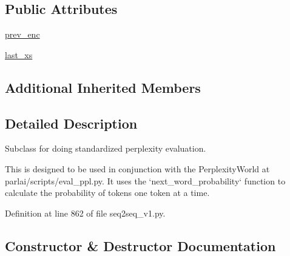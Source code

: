 \subsection*{Public Attributes}
\begin{DoxyCompactItemize}
\item 
\hyperlink{classparlai_1_1agents_1_1legacy__agents_1_1seq2seq_1_1seq2seq__v1_1_1PerplexityEvaluatorAgent_a8f896a71b1f4eef69d66f3ae48156937}{prev\+\_\+enc}
\item 
\hyperlink{classparlai_1_1agents_1_1legacy__agents_1_1seq2seq_1_1seq2seq__v1_1_1PerplexityEvaluatorAgent_a637c8434588948fb0367cd749c18e690}{last\+\_\+xs}
\end{DoxyCompactItemize}
\subsection*{Additional Inherited Members}


\subsection{Detailed Description}
\begin{DoxyVerb}Subclass for doing standardized perplexity evaluation.

This is designed to be used in conjunction with the PerplexityWorld at
parlai/scripts/eval_ppl.py. It uses the `next_word_probability` function to
calculate the probability of tokens one token at a time.
\end{DoxyVerb}
 

Definition at line 862 of file seq2seq\+\_\+v1.\+py.



\subsection{Constructor \& Destructor Documentation}
\mbox{\label{classparlai_1_1agents_1_1legacy__agents_1_1seq2seq_1_1seq2seq__v1_1_1PerplexityEvaluatorAgent_acf3daa1b1bfc893504efa07f3eb9b667}} 

